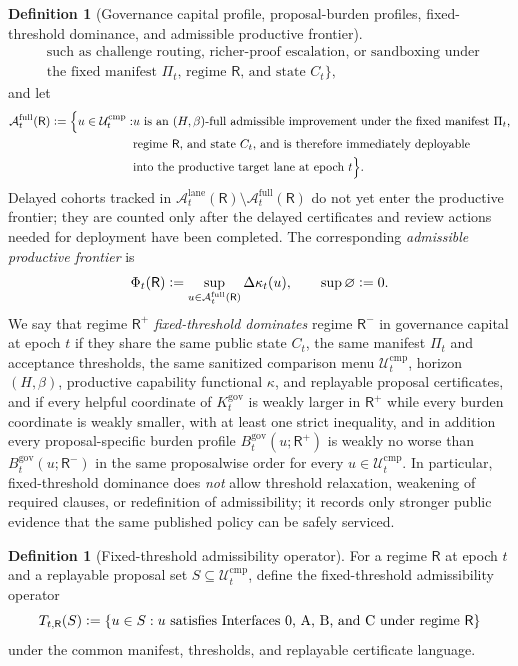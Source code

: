 \documentclass[11pt]{article}
\theoremstyle{definition}
\newtheorem{definition}[theorem]{Definition}
\newcommand{\1}{\mathbf{1}}
\newcommand{\Defeq}{\vcentcolon=}
\begin{document}
\begin{definition}[Governance capital profile, proposal-burden profiles, fixed-threshold dominance, and admissible productive frontier]
\[\begin{aligned}
&\text{such as challenge routing, richer-proof escalation, or sandboxing under }\\
&\text{the fixed manifest $\Pi_t$, regime $\mathsf R$, and state $C_t$}\Bigr\},
\end{aligned}
\]
and let
\[
\begin{aligned}
\mathcal A_t^{\mathrm{full}}(\mathsf R)\Defeq
\Bigl\{u\in\mathcal U_t^{\mathrm{cmp}}:
&\text{$u$ is an $(H,\beta)$-full admissible improvement under the fixed manifest $\Pi_t$,}\\
&\text{regime $\mathsf R$, and state $C_t$, and is therefore immediately deployable}\\
&\text{into the productive target lane at epoch $t$}\Bigr\}.
\end{aligned}
\]
Delayed cohorts tracked in $\mathcal A_t^{\mathrm{lane}}(\mathsf R)\setminus \mathcal A_t^{\mathrm{full}}(\mathsf R)$ do not yet enter the productive frontier; they are counted only after the delayed certificates and review actions needed for deployment have been completed. The corresponding \emph{admissible productive frontier} is
\[
\Phi_t(\mathsf R)\Defeq \sup_{u\in\mathcal A_t^{\mathrm{full}}(\mathsf R)} \Delta\kappa_t(u),
\qquad
\sup\varnothing\Defeq 0.
\]
We say that regime $\mathsf R^+$ \emph{fixed-threshold dominates} regime $\mathsf R^-$ in governance capital at epoch $t$ if they share the same public state $C_t$, the same manifest $\Pi_t$ and acceptance thresholds, the same sanitized comparison menu $\mathcal U_t^{\mathrm{cmp}}$, horizon $(H,\beta)$, productive capability functional $\kappa$, and replayable proposal certificates, and if every helpful coordinate of $K_t^{\mathrm{gov}}$ is weakly larger in $\mathsf R^+$ while every burden coordinate is weakly smaller, with at least one strict inequality, and in addition every proposal-specific burden profile $B_t^{\mathrm{gov}}(u;\mathsf R^+)$ is weakly no worse than $B_t^{\mathrm{gov}}(u;\mathsf R^-)$ in the same proposalwise order for every $u\in\mathcal U_t^{\mathrm{cmp}}$. In particular, fixed-threshold dominance does \emph{not} allow threshold relaxation, weakening of required clauses, or redefinition of admissibility; it records only stronger public evidence that the same published policy can be safely serviced.
\end{definition}

\begin{definition}[Fixed-threshold admissibility operator]\label{def:admissibility_operator}
For a regime $\mathsf R$ at epoch $t$ and a replayable proposal set $S\subseteq \mathcal U_t^{\mathrm{cmp}}$, define the fixed-threshold admissibility operator
\[
T_{t,\mathsf R}(S)\Defeq \{u\in S: u\text{ satisfies Interfaces 0, A, B, and C under regime }\mathsf R\}
\]
under the common manifest, thresholds, and replayable certificate language.
\end{definition}
\end{document}
